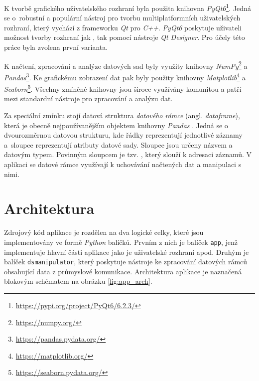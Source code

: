 K tvorbě grafického uživatelského rozhraní byla použita knihovna \emph{PyQt6}\footnote{\url{https://pypi.org/project/PyQt6/6.2.3/}}. Jedná se o~robustní a populární nástroj pro tvorbu multiplatformních uživatelských rozhraní, který vychází z frameworku \emph{Qt} pro \emph{C++}. \emph{PyQt6} poskytuje uživateli možnost tvorby rozhraní jak , tak pomocí nástroje \emph{Qt Designer}. Pro účely této práce byla zvolena první varianta.

K načtení, zpracování a analýze datových sad byly využity knihovny \emph{NumPy}\footnote{\url{https://numpy.org/}} a \emph{Pandas}\footnote{\url{https://pandas.pydata.org/}}. Ke grafickému zobrazení dat pak byly použity knihovny \emph{Matplotlib}\footnote{\url{https://matplotlib.org/}} a \emph{Seaborn}\footnote{\url{https://seaborn.pydata.org/}}. Všechny zmíněné knihovny jsou široce využívány komunitou a patří mezi standardní nástroje pro zpracování a analýzu dat.

Za speciální zmínku stojí datová struktura \emph{datového rámce} (angl. \emph{dataframe}), která je obecně nejpoužívanějším objektem knihovny \emph{Pandas} \cite{df}. Jedná se o dvourozměrnou datovou strukturu, kde řádky reprezentují jednotlivé záznamy a~sloupce reprezentují atributy datové sady. Sloupce jsou určeny názvem a datovým typem. Povinným sloupcem je tzv. , který slouží k adresaci záznamů. V aplikaci se datové rámce využívají k uchovávání načtených dat a manipulaci s nimi.

\section{Architektura}
\label{app_architecture}

Zdrojový kód aplikace je rozdělen na dva logické celky, které jsou implementovány ve formě \emph{Python} balíčků. Prvním z nich je balíček \texttt{app}, jenž implementuje hlavní části aplikace jako je uživatelské rozhraní apod. Druhým je balíček \texttt{dsmanipulator}, který poskytuje nástroje ke zpracování datových rámců obsahující data z průmyslové komunikace. Architektura aplikace je naznačená blokovým schématem na obrázku \ref{fig:app_arch}.

